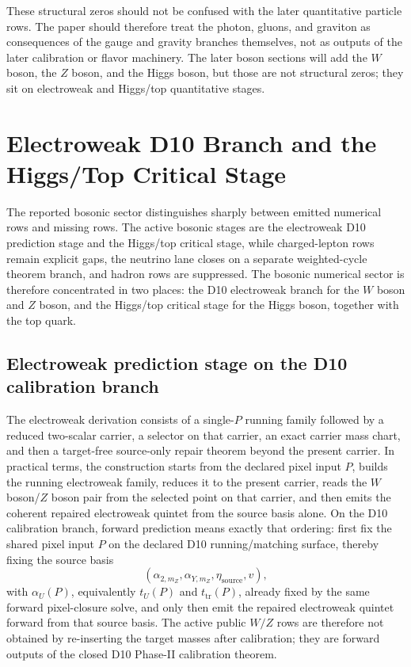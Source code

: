 \documentclass[11pt]{article}
\begin{document}
These structural zeros should not be confused with the later quantitative particle rows. The
paper should therefore treat the photon, gluons, and graviton as consequences of the
gauge and gravity branches themselves, not as outputs of the later calibration or flavor
machinery. The later boson sections will add the \(W\) boson, the \(Z\) boson, and the Higgs
boson, but those are not structural zeros; they sit on electroweak and Higgs/top quantitative stages.

\section{Electroweak D10 Branch and the Higgs/Top Critical Stage}

The reported bosonic sector distinguishes sharply between emitted numerical rows and
missing rows. The active bosonic stages are the electroweak
D10 prediction stage and the Higgs/top critical stage, while charged-lepton rows
remain explicit gaps, the neutrino lane closes on a separate weighted-cycle theorem branch, and hadron rows are suppressed. The bosonic numerical
sector is therefore concentrated in two places: the D10 electroweak branch for the \(W\) boson and \(Z\) boson, and
the Higgs/top critical stage for the Higgs boson, together with the top quark.

\subsection{Electroweak prediction stage on the D10 calibration branch}

The electroweak derivation consists of a single-\(P\) running family followed by a
reduced two-scalar carrier, a selector on that carrier, an exact carrier mass chart, and
then a target-free source-only repair theorem beyond the present carrier. In practical terms, the construction starts from
the declared pixel input \(P\), builds the running electroweak family, reduces it to the present
carrier, reads the \(W\) boson/\(Z\) boson pair from the selected point on that carrier,
and then emits the coherent repaired electroweak quintet from the source basis alone.
On the D10 calibration branch, forward prediction means exactly that ordering: first fix the shared pixel input \(P\) on the
declared D10 running/matching surface, thereby fixing the source basis
\[
(\alpha_{2,m_Z},\alpha_{Y,m_Z},\eta_{\mathrm{source}},v),
\]
with \(\alpha_U(P)\), equivalently \(t_U(P)\) and \(t_{\mathrm{tr}}(P)\), already fixed by the
same forward pixel-closure solve,
and only then emit the repaired electroweak quintet forward from that source basis. The
active public \(W/Z\) rows are therefore not obtained by re-inserting the target masses after
calibration; they are forward outputs of the closed D10 Phase-II calibration theorem.
\end{document}
